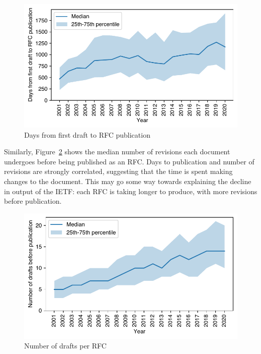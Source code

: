 \documentclass[twocolumn,10pt]{article}
\newlength{\figureWidthOneColumn}
\begin{document}
\begin{figure}
  \centering
  \includegraphics[width=\figureWidthOneColumn]{figures-prev/imc-2021/documents/day_counts_yearly.pdf}
  \caption{
    Days from first draft to RFC publication
  }
  \label{fig:rfcs_days_to_pub}
\end{figure}

Similarly, Figure~\ref{fig:drafts_year} shows the median number of
revisions each document undergoes before being published as an RFC. Days to
publication and number of revisions are strongly correlated, suggesting
that the time is spent making changes to the document. This may go some way
towards explaining the decline in output of the IETF: each RFC is taking
longer to produce, with more revisions before publication. 

\begin{figure}
  \centering
  \includegraphics[width=\figureWidthOneColumn]{figures-prev/imc-2021/documents/draft_counts_yearly.pdf}
  \caption{
    Number of drafts per RFC
  }
  \label{fig:drafts_year}
\end{figure}
\end{document}
